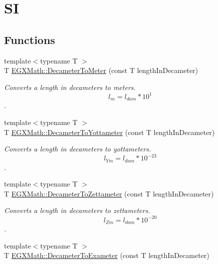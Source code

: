 \hypertarget{group___e_g_x_math-_conversions-_length_conversions-_s_i-_decameter-_s_i}{}\section{SI}
\label{group___e_g_x_math-_conversions-_length_conversions-_s_i-_decameter-_s_i}
\subsection*{Functions}
\begin{DoxyCompactItemize}
\item 
{\footnotesize template$<$typename T $>$ }\\T \mbox{\hyperlink{group___e_g_x_math-_conversions-_length_conversions-_s_i-_decameter-_s_i_gac7f762a09c6496efaab29ecdbfb88a2c}{E\+G\+X\+Math\+::\+Decameter\+To\+Meter}} (const T length\+In\+Decameter)
\begin{DoxyCompactList}\small\item\em Converts a length in decameters to meters. \[ l_{m}=l_{dam} * 10^{1} \]. \end{DoxyCompactList}\item 
{\footnotesize template$<$typename T $>$ }\\T \mbox{\hyperlink{group___e_g_x_math-_conversions-_length_conversions-_s_i-_decameter-_s_i_gaa10c7c9c4e75fc2d647d4f85ff8d801b}{E\+G\+X\+Math\+::\+Decameter\+To\+Yottameter}} (const T length\+In\+Decameter)
\begin{DoxyCompactList}\small\item\em Converts a length in decameters to yottameters. \[ l_{Ym}=l_{dam} * 10^{-23} \]. \end{DoxyCompactList}\item 
{\footnotesize template$<$typename T $>$ }\\T \mbox{\hyperlink{group___e_g_x_math-_conversions-_length_conversions-_s_i-_decameter-_s_i_ga63a6a9ec3ac42c9837818b82b1fdbcbb}{E\+G\+X\+Math\+::\+Decameter\+To\+Zettameter}} (const T length\+In\+Decameter)
\begin{DoxyCompactList}\small\item\em Converts a length in decameters to zettameters. \[ l_{Zm}=l_{dam} * 10^{-20} \]. \end{DoxyCompactList}\item 
{\footnotesize template$<$typename T $>$ }\\T \mbox{\hyperlink{group___e_g_x_math-_conversions-_length_conversions-_s_i-_decameter-_s_i_ga66b4bffe5923acdb3c8a249d81be196f}{E\+G\+X\+Math\+::\+Decameter\+To\+Exameter}} (const T length\+In\+Decameter)

\end{DoxyCompactItemize}
